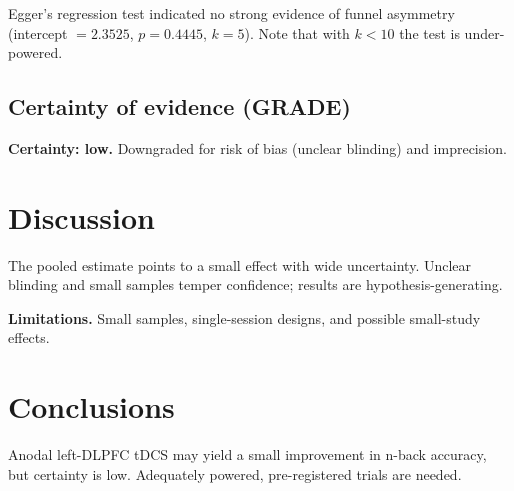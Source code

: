 \documentclass[11pt]{article}
\begin{document}
Egger's regression test indicated no strong evidence of funnel asymmetry (intercept $=2.3525$, $p=0.4445$, $k=5$). Note that with $k<10$ the test is under-powered.
\subsection{Certainty of evidence (GRADE)}
\textbf{Certainty: low.} Downgraded for risk of bias (unclear blinding) and imprecision.
\section{Discussion}
The pooled estimate points to a small effect with wide uncertainty. Unclear blinding and small samples temper confidence; results are hypothesis-generating.

\textbf{Limitations.} Small samples, single-session designs, and possible small-study effects.
\section{Conclusions}
Anodal left-DLPFC tDCS may yield a small improvement in n-back accuracy, but certainty is low. Adequately powered, pre-registered trials are needed.
\appendix
\end{document}
